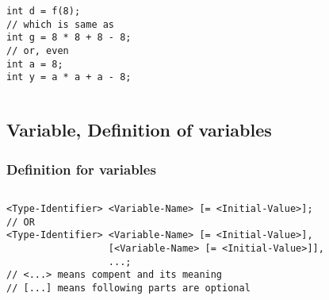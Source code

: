 \documentclass[
  11pt, %
  xcolor=dvipsnames
]{beamer}
\begin{document}
\begin{frame}[fragile]
\begin{columns}[c]
\begin{column}{0.9\textwidth}
\begin{columns}[c]
\begin{column}{0.5\textwidth}
					\begin{lstlisting}[style=Java]
int d = f(8);
// which is same as 
int g = 8 * 8 + 8 - 8;
// or, even
int a = 8;
int y = a * a + a - 8;
          \end{lstlisting}
				\end{column}
			\end{columns}

		\end{column}
	\end{columns}

\end{frame}

\subsection{Variable, Definition of variables}
\begin{frame}[fragile]
	\frametitle{Definition for variables}


	\begin{columns}[c]
		\begin{column}{0.9\textwidth}

			\begin{lstlisting}
<Type-Identifier> <Variable-Name> [= <Initial-Value>];
// OR
<Type-Identifier> <Variable-Name> [= <Initial-Value>],
                  [<Variable-Name> [= <Initial-Value>]],
                  ...;
// <...> means compent and its meaning
// [...] means following parts are optional
      \end{lstlisting}


\end{column}
\end{columns}
\end{frame}
\end{document}
